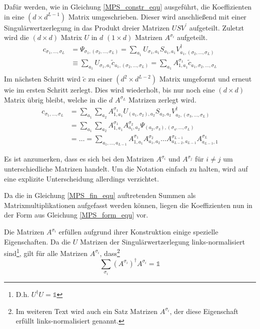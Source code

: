 \documentclass[10pt,a4paper]{report}
\newcommand{\SumIndex}{\sigma_1,\ldots,\sigma_L}
\begin{document}
Dafür werden, wie in Gleichung \ref{MPS_constr_equ} ausgeführt, die Koeffizienten in eine $(d\times d^{L-1})$ Matrix umgeschrieben. Dieser wird anschließend mit einer Singulärwertzerlegung in das Produkt dreier Matrizen $USV^{\prime}$ aufgeteilt. Zuletzt wird die $(d\times d)$ Matrix $U$ in $d$ $(1\times d)$ Matrizen $A^{\sigma_i}$ aufgeteilt. 
\begin{equation}
\label{MPS_constr_equ}
\begin{split}
c_{\SumIndex}&=\Psi_{\sigma_1,(\sigma_2,\ldots,\sigma_L)} =\sum_{a_1}U_{\sigma_1,a_1}S_{a_1,a_1}V^\dagger_{a_1,(\sigma_2,\ldots,\sigma_L)} \\
&\equiv\sum_{a_1}U_{\sigma_1,a_1}\tilde{c}_{a_1,(\sigma_2,\ldots,\sigma_L)}=\sum_{a_1}A_{1,a_1}^{\sigma_1}\tilde{c}_{a_1,\sigma_2,\ldots,\sigma_L} \\
\end{split}
\end{equation}
Im nächsten Schritt wird $\tilde{c}$ zu einer $(d^2 \times d^{L-2})$ Matrix umgeformt und erneut wie im ersten Schritt zerlegt. Dies wird wiederholt, bis nur noch eine $(d\times d)$ Matrix übrig bleibt, welche in die $d$ $A^{\sigma_L}$ Matrizen zerlegt wird.
\begin{equation}
\label{MPS_fin_equ}
\begin{split}
c_{\SumIndex}&=\sum_{a_1}\sum_{a_2}A_{1,a_1}^{\sigma_1}U_{(a_1,\sigma_2),a_2}S_{a_2,a_2}V_{a_2,(\sigma_3,\ldots,\sigma_L)}^\dagger\\
&=\sum_{a_1}\sum_{a_2}A_{1,a_1}^{\sigma_1}A_{a_1,a_2}^{\sigma_2}\Psi_{(a_2,\sigma_3),(\sigma_4,\ldots,\sigma_L)}\\
&=\ldots=\sum_{a_1,\ldots,a_{L-1}}A_{1,a_1}^{\sigma_1}A_{a_1,a_2}^{\sigma_2}\ldots A_{a_{L-2},a_{L-1}}^{\sigma_{L-1}}A_{a_{L-1},1}^{\sigma_L}
\end{split}
\end{equation}

Es ist anzumerken, dass es sich bei den Matrizen $A^{\sigma_i}$ und $A^{\sigma_j}$ für $i\neq j$ um unterschiedliche Matrizen handelt. Um die Notation einfach zu halten, wird auf eine explizite Unterscheidung allerdings verzichtet.

Da die in Gleichung \ref{MPS_fin_equ} auftretenden Summen als Matrixmultiplikationen aufgefasst werden können, liegen die Koeffizienten nun in der Form aus Gleichung \ref{MPS_form_equ} vor. 

Die Matrizen $A^{\sigma_i}$ erfüllen aufgrund ihrer Konstruktion einige spezielle Eigenschaften. Da die $U$ Matrizen der Singulärwertzerlegung links-normalisiert sind\footnote{D.h. $U^\dagger U=\mathbb{1}$}, gilt für alle Matrizen $A^{\sigma_i}$, dass\footnote{Im weiteren Text wird auch ein Satz Matrizen $A^{\sigma_i}$, der diese Eigenschaft erfüllt links-normalisiert genannt.}
\begin{equation}
\sum_{\sigma_i}(A^{\sigma_i})^{\dagger}A^{\sigma_i}=\mathbb{1}
\end{equation}
\end{document}
